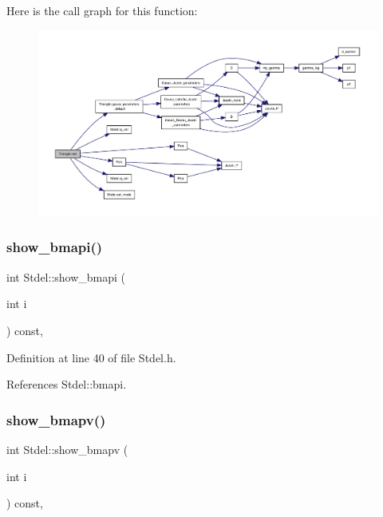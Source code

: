 Here is the call graph for this function\+:
\nopagebreak
\begin{figure}[H]
\begin{center}
\leavevmode
\includegraphics[width=350pt]{classTriangle_a51d0da1119ccde5c695ea4da980bda8d_cgraph}
\end{center}
\end{figure}
\mbox{\label{classStdel_ad3a0646ad7ec2567e46da36285dee331}} 
\subsubsection{\texorpdfstring{show\+\_\+bmapi()}{show\_bmapi()}}
{\footnotesize\ttfamily int Stdel\+::show\+\_\+bmapi (\begin{DoxyParamCaption}\item[{int}]{i }\end{DoxyParamCaption}) const\hspace{0.3cm}{\ttfamily [inline]}, {\ttfamily [inherited]}}



Definition at line 40 of file Stdel.\+h.



References Stdel\+::bmapi.

\mbox{\label{classStdel_ac8787dabfb1d767b89e39806522c1161}} 
\subsubsection{\texorpdfstring{show\+\_\+bmapv()}{show\_bmapv()}}
{\footnotesize\ttfamily int Stdel\+::show\+\_\+bmapv (\begin{DoxyParamCaption}\item[{int}]{i }\end{DoxyParamCaption}) const\hspace{0.3cm}{\ttfamily [inline]}, {\ttfamily [inherited]}}



